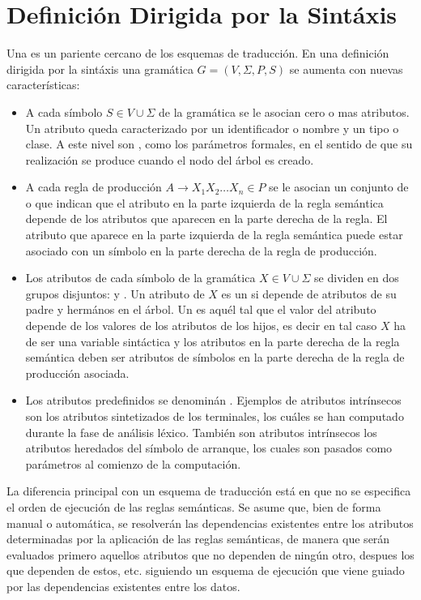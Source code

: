 \section{Definición Dirigida por la Sintáxis}
Una  es un pariente cercano
de los esquemas de traducción. En una definición dirigida por la
sintáxis una gramática $G = (V, \Sigma, P, S)$ se aumenta 
con nuevas características:
\begin{itemize}
\item
A cada símbolo $S \in V \cup \Sigma$ de la gramática se le asocian
cero o mas atributos. Un atributo queda caracterizado por un identificador
o nombre y un tipo o clase. A este nivel son ,
como los parámetros formales, en el sentido de que su realización 
se produce cuando el nodo del árbol es creado.
\item
A cada regla de producción $A \rightarrow X_1 X_2 \ldots X_n \in P$
se le asocian un conjunto de 
o  que indican que el atributo en la parte
izquierda de la regla semántica depende de los atributos que aparecen en la parte
derecha de la regla. El atributo que aparece en la parte izquierda de la regla semántica
puede estar asociado con un símbolo en la parte derecha de la regla de producción.
\item
Los atributos de cada símbolo de la gramática $X \in V \cup \Sigma$
se dividen en dos grupos disjuntos: 
y . Un atributo de $X$ es un  
si depende de atributos de su padre y hermános en el árbol.
Un  es aquél tal que el valor del atributo depende
de los valores de los atributos de los hijos, 
es decir en tal caso $X$ ha de ser una variable sintáctica
y los atributos en la parte derecha de la regla semántica deben
ser atributos de símbolos en la parte derecha de la regla de producción 
asociada.
\item
Los atributos predefinidos se denominán .
Ejemplos de atributos intrínsecos son los atributos 
sintetizados de los terminales, los cuáles se han
computado durante la fase de análisis léxico. También
son atributos intrínsecos los atributos heredados del símbolo
de arranque, los cuales son pasados como parámetros 
al comienzo de la computación.
\end{itemize}

La diferencia principal con un esquema de traducción está en que
no se especifica el orden de ejecución de las reglas semánticas.
Se asume que, bien de forma manual o automática, se resolverán
las dependencias existentes entre los atributos determinadas
por la aplicación de las reglas semánticas, de manera
que serán evaluados primero aquellos atributos que no dependen
de ningún otro, despues los que dependen de estos, etc. siguiendo
un esquema de ejecución que viene guiado por las dependencias
existentes entre los datos.

